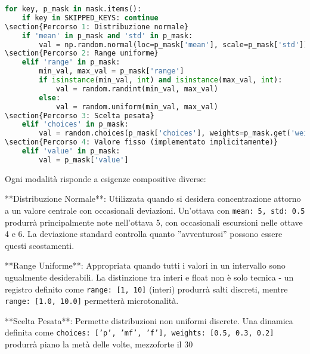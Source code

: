 \begin{lstlisting}[language=Python]
for key, p_mask in mask.items():
    if key in SKIPPED_KEYS: continue
\section{Percorso 1: Distribuzione normale}
    if 'mean' in p_mask and 'std' in p_mask:
        val = np.random.normal(loc=p_mask['mean'], scale=p_mask['std'])
\section{Percorso 2: Range uniforme}
    elif 'range' in p_mask:
        min_val, max_val = p_mask['range']
        if isinstance(min_val, int) and isinstance(max_val, int):
            val = random.randint(min_val, max_val)
        else:
            val = random.uniform(min_val, max_val)
\section{Percorso 3: Scelta pesata}
    elif 'choices' in p_mask:
        val = random.choices(p_mask['choices'], weights=p_mask.get('weights'), k=1)[0]
\section{Percorso 4: Valore fisso (implementato implicitamente)}
    elif 'value' in p_mask:
        val = p_mask['value']
\end{lstlisting}

Ogni modalità risponde a esigenze compositive diverse:

**Distribuzione Normale**: Utilizzata quando si desidera concentrazione attorno a un valore centrale con occasionali deviazioni. Un'ottava con \texttt{mean: 5, std: 0.5} produrrà principalmente note nell'ottava 5, con occasionali escursioni nelle ottave 4 e 6. La deviazione standard controlla quanto ''avventurosi'' possono essere questi scostamenti.

**Range Uniforme**: Appropriata quando tutti i valori in un intervallo sono ugualmente desiderabili. La distinzione tra interi e float non è solo tecnica - un registro definito come \texttt{range: [1, 10]} (interi) produrrà salti discreti, mentre \texttt{range: [1.0, 10.0]} permetterà microtonalità.

**Scelta Pesata**: Permette distribuzioni non uniformi discrete. Una dinamica definita come \texttt{choices: ['p', 'mf', 'f'], weights: [0.5, 0.3, 0.2]} produrrà piano la metà delle volte, mezzoforte il 30%

